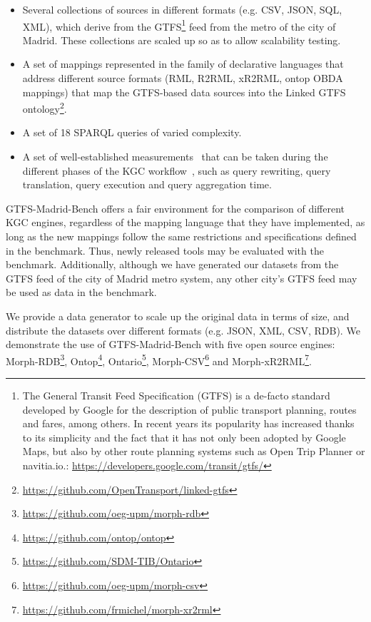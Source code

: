 \begin{itemize}
    \item Several collections of sources in different formats (e.g. CSV, JSON, SQL, XML), which derive from the GTFS\footnote{The General Transit Feed Specification (GTFS) is a de-facto standard developed by Google for the description of public transport planning, routes and fares, among others. In recent years its popularity has increased thanks to its simplicity and the fact that it has not only been adopted by Google Maps, but also by other route planning systems such as Open Trip Planner or navitia.io.: \url{https://developers.google.com/transit/gtfs/}} feed from the metro of the city of Madrid. These collections are scaled up so as to allow scalability testing.
    \item A set of mappings represented in the family of declarative languages that address different source formats (RML, R2RML, xR2RML, ontop OBDA mappings) that map the GTFS-based data sources into the Linked GTFS ontology\footnote{\url{https://github.com/OpenTransport/linked-gtfs}}.
    \item A set of 18 SPARQL queries of varied complexity.
    \item A set of well-established measurements~\citep{mora2013towards,lanti2015npd} that can be taken during the different phases of the KGC workflow~\citep{lanti2015npd,acosta2011anapsid}, such as query rewriting, query translation, query execution and query aggregation time.
\end{itemize}
GTFS-Madrid-Bench offers a fair environment for the comparison of different KGC engines, regardless of the mapping language that they have implemented, as long as the new mappings follow the same restrictions and specifications defined in the benchmark. Thus, newly released tools may be evaluated with the benchmark. Additionally, although we have generated our datasets from the GTFS feed of the city of Madrid metro system, any other city's GTFS feed may be used as data in the benchmark. 

We provide a data generator to scale up the original data in terms of size, and distribute the datasets over different formats (e.g. JSON, XML, CSV, RDB). We demonstrate the use of GTFS-Madrid-Bench with five open source engines: Morph-RDB\footnote{\url{https://github.com/oeg-upm/morph-rdb}}, Ontop\footnote{\url{https://github.com/ontop/ontop}}, Ontario\footnote{\url{https://github.com/SDM-TIB/Ontario}}, Morph-CSV\footnote{\url{https://github.com/oeg-upm/morph-csv}} and Morph-xR2RML\footnote{\url{https://github.com/frmichel/morph-xr2rml}}. 

